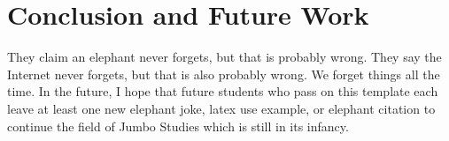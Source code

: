 \chapter{Conclusion and Future Work}  \label{conclusion}

They claim an elephant never forgets, but that is probably wrong. They
say the Internet never forgets, but that is also probably wrong. We
forget things all the time. In the future, I hope that future students
who pass on this template each leave at least one new elephant joke,
latex use example, or elephant citation to continue the field of Jumbo
Studies which is still in its infancy.


